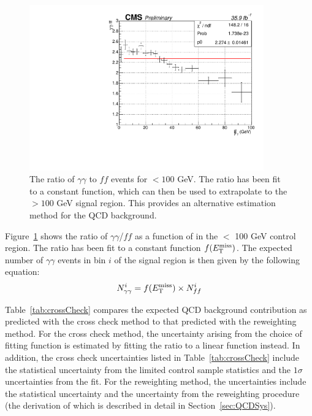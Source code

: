 \begin{figure}[h]
\begin{center}
\includegraphics[width=0.9\textwidth]{Figures/DataAnalysis/crossCheckFit.pdf}
\end{center}
\caption{The ratio of $\gamma\gamma$ to $ff$ events for \ETmiss$ < 100$ GeV. 
The ratio has been fit to a constant function, which can then be used to 
extrapolate to the \ETmiss$ >100$ GeV signal region. 
This provides an alternative estimation method for the QCD background.}
\label{fig:crossCheck}
\end{figure}

Figure~\ref{fig:crossCheck} shows the ratio of $\gamma\gamma$/$ff$ as a function of \ETmiss in the \ETmiss $<$ 100 GeV control region. The ratio has been fit to a constant function $f(E_{\mathrm{T}}^{\text{miss}})$. The expected number of $\gamma\gamma$ events in bin $i$ of the signal region is then given by the following equation:
\begin{equation}
N_{\gamma\gamma}^i = f(E_{\mathrm{T}}^{\text{miss}}) \times N_{ff}^i 
\end{equation}

Table~\ref{tab:crossCheck} compares the expected QCD background contribution as predicted with the cross check method to that predicted with the \diempt reweighting method. For the cross check method, the uncertainty arising from the choice of fitting function is estimated by fitting the ratio to a linear function instead. In addition, the cross check uncertainties listed in Table~\ref{tab:crossCheck} include the statistical uncertainty from the limited control sample statistics and the $1\sigma$ uncertainties from the fit. For the \diempt reweighting method, the uncertainties include the statistical uncertainty and the uncertainty from the \diempt reweighting procedure (the derivation of which is described in detail in Section~\ref{sec:QCDSys}). 

